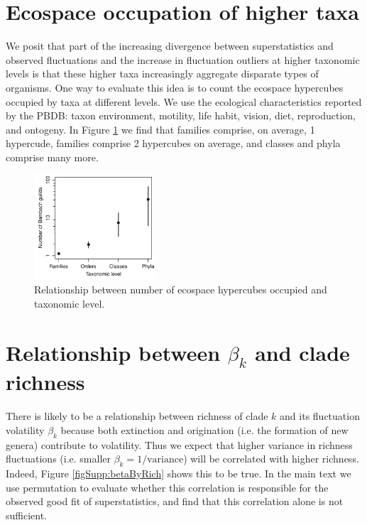 \documentclass[12pt]{article}
\let\citep=\cite
\begin{document}
\section{Ecospace occupation of higher taxa}
\label{sec:suppGuilds} 

We posit that part of the increasing divergence between
superstatistics and observed fluctuations and the increase in
fluctuation outliers at higher taxonomic levels is that these higher
taxa increasingly aggregate disparate types of organisms. One way to
evaluate this idea is to count the ecospace hypercubes
\citep{bambach1983, bambach2007, bush2007} occupied by taxa at
different levels. We use the ecological characteristics reported by
the PBDB: taxon environment, motility, life habit, vision, diet,
reproduction, and ontogeny. In Figure \ref{figSupp:eeSpaceOcc} we find
that families comprise, on average, 1 hypercude, families comprise 2
hypercubes on average, and classes and phyla comprise many more.

\begin{figure}[!hp]
  \centering
  \includegraphics[width=0.4\textwidth]{../../figSupp_eeSpaceOcc.pdf} 
  \caption{Relationship between number of ecospace hypercubes occupied
    and taxonomic level.}
  \label{figSupp:eeSpaceOcc}
\end{figure}


\section{Relationship between $\beta_k$ and clade richness}
\label{sec:suppBetaRichness} 

There is likely to be a relationship between richness of clade $k$ and
its fluctuation volatility $\beta_k$ because both extinction and
origination (i.e. the formation of new genera) contribute to
volatility. Thus we expect that higher variance in richness
fluctuations (i.e. smaller $\beta_k = 1/\text{variance}$) will be
correlated with higher richness.  Indeed, Figure
\ref{figSupp:betaByRich} shows this to be true. In the main text we
use permutation to evaluate whether this correlation is responsible
for the observed good fit of superstatistics, and find that this
correlation alone is not sufficient.
\end{document}
